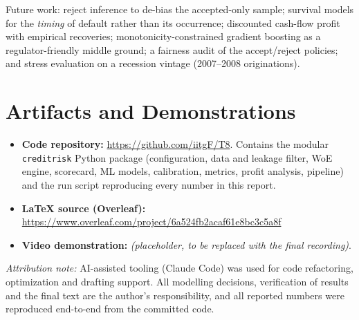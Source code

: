 \documentclass[a4paper,twocolumn,10pt]{article}
\begin{document}
Future work: reject inference to de-bias the accepted-only sample; survival models for the \emph{timing} of default rather than its occurrence; discounted cash-flow profit with empirical recoveries; monotonicity-constrained gradient boosting as a regulator-friendly middle ground; a fairness audit of the accept/reject policies; and stress evaluation on a recession vintage (2007--2008 originations).

\section{Artifacts and Demonstrations}

\begin{itemize}
  \item \textbf{Code repository:} \url{https://github.com/iitgF/T8}. Contains the modular \texttt{creditrisk} Python package (configuration, data and leakage filter, WoE engine, scorecard, ML models, calibration, metrics, profit analysis, pipeline) and the run script reproducing every number in this report.
  \item \textbf{LaTeX source (Overleaf):} \url{https://www.overleaf.com/project/6a524fb2acaf61e8bc3c5a8f}
  \item \textbf{Video demonstration:} \emph{(placeholder, to be replaced with the final recording)}.
\end{itemize}

\vspace{2mm}
\noindent\textit{Attribution note:} AI-assisted tooling (Claude Code) was used for code refactoring, optimization and drafting support. All modelling decisions, verification of results and the final text are the author's responsibility, and all reported numbers were reproduced end-to-end from the committed code.
\end{document}
